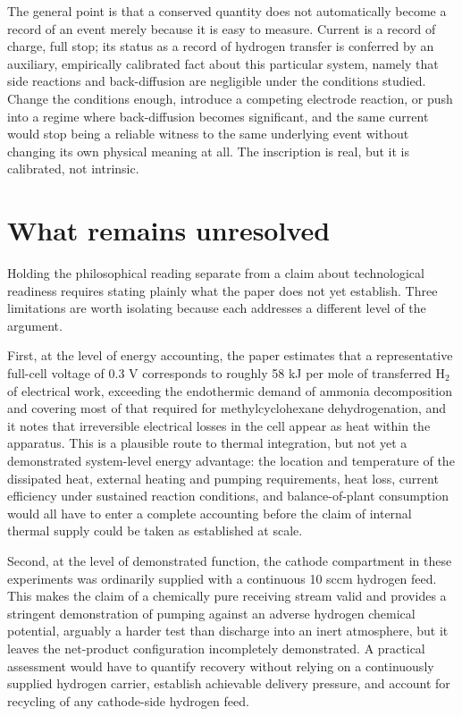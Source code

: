 \documentclass[11pt]{article}
\begin{document}
The general point is that a conserved quantity does not automatically become a record of an event merely because it is easy to measure. Current is a record of charge, full stop; its status as a record of hydrogen transfer is conferred by an auxiliary, empirically calibrated fact about this particular system, namely that side reactions and back-diffusion are negligible under the conditions studied. Change the conditions enough, introduce a competing electrode reaction, or push into a regime where back-diffusion becomes significant, and the same current would stop being a reliable witness to the same underlying event without changing its own physical meaning at all. The inscription is real, but it is calibrated, not intrinsic.

\section{What remains unresolved}

Holding the philosophical reading separate from a claim about technological readiness requires stating plainly what the paper does not yet establish. Three limitations are worth isolating because each addresses a different level of the argument.

First, at the level of energy accounting, the paper estimates that a representative full-cell voltage of 0.3 V corresponds to roughly 58 kJ per mole of transferred H$_2$ of electrical work, exceeding the endothermic demand of ammonia decomposition and covering most of that required for methylcyclohexane dehydrogenation, and it notes that irreversible electrical losses in the cell appear as heat within the apparatus. This is a plausible route to thermal integration, but not yet a demonstrated system-level energy advantage: the location and temperature of the dissipated heat, external heating and pumping requirements, heat loss, current efficiency under sustained reaction conditions, and balance-of-plant consumption would all have to enter a complete accounting before the claim of internal thermal supply could be taken as established at scale.

Second, at the level of demonstrated function, the cathode compartment in these experiments was ordinarily supplied with a continuous 10 sccm hydrogen feed. This makes the claim of a chemically pure receiving stream valid and provides a stringent demonstration of pumping against an adverse hydrogen chemical potential, arguably a harder test than discharge into an inert atmosphere, but it leaves the net-product configuration incompletely demonstrated. A practical assessment would have to quantify recovery without relying on a continuously supplied hydrogen carrier, establish achievable delivery pressure, and account for recycling of any cathode-side hydrogen feed.
\end{document}
